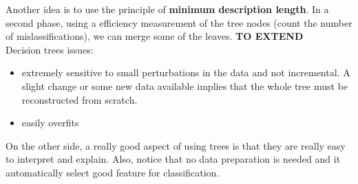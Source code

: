 Another idea is to use the principle of \textbf{minimum description length}. In a second phase, using a efficiency measurement of the tree nodes (count the number of mislassifications), we can merge some of the leaves. \textbf{TO EXTEND}\\
Decision trees issues:
\begin{itemize}
	\item extremely sensitive to small perturbations in the data and not incremental. A slight change or some new data available implies that the whole tree must be reconstructed from scratch.
	\item easily overfits
\end{itemize}

On the other side, a really good aspect of using trees is that they are really easy to interpret and explain. Also, notice that no data preparation is needed and it automatically select good feature for classification.
